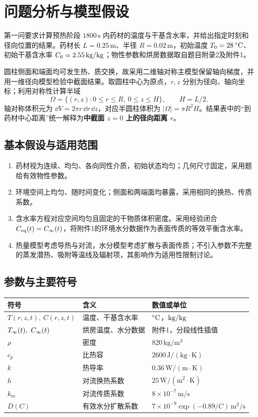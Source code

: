 \section{问题分析与模型假设}

第一问要求计算预热阶段 $1800\,\mathrm{s}$ 内药材的温度与干基含水率，并给出指定时刻和径向位置的结果。药材长 $L=0.25\,\mathrm{m}$、半径 $R=0.02\,\mathrm{m}$，初始温度 $T_0=28\,\celsius$、初始干基含水率 $C_0=2.55\,\kgkg$；物性参数和烘房数据取自题目附录2及附件1\cite{problem}。

圆柱侧面和端面均可发生热、质交换，故采用二维轴对称主模型保留轴向梯度，并用一维径向模型检验中截面结果。取圆柱中心为原点，$r,z$ 分别为径向、轴向坐标；利用对称性计算半域
\begin{equation}
  \Omega=\{(r,z):0\le r\le R,\ 0\le z\le H\},\qquad H=L/2.
  \label{eq:domain}
\end{equation}
轴对称体积元为 $\dd V=2\pi r\,\dd r\,\dd z$，对应半圆柱体积为 $|\Omega|=\pi R^2H$。结果表中的“到药材中心距离”统一解释为\textbf{中截面 $z=0$ 上的径向距离 $r$}。

\subsection{基本假设与适用范围}
\begin{enumerate}
  \item 药材视为连续、均匀、各向同性介质，初始状态均匀；几何尺寸固定，采用题给有效物性参数。
  \item 环境空间上均匀、随时间变化；侧面和两端面均暴露，采用相同的换热、传质系数。
  \item 含水率方程对应空间均匀且固定的干物质体积密度。采用经验闭合 $\Ceq(t)=C_\infty(t)$，将附件1的环境水分数据作为表面传质的等效平衡含水率。
  \item 热量模型考虑导热与对流，水分模型考虑扩散与表面传质；不引入参数不完整的蒸发潜热、吸附等温线及辐射项，其影响作为适用性限制讨论。
\end{enumerate}

\subsection{参数与主要符号}
\begin{center}
\small
\begin{tabular}{lll}
\toprule
符号 & 含义 & 数值或单位\\
\midrule
$T(r,z,t),\ C(r,z,t)$ & 温度、干基含水率 & $\celsius$，$\kgkg$\\
$\Tin(t),\ C_\infty(t)$ & 烘房温度、水分数据 & 附件1，分段线性插值\\
$\rho$ & 密度 & $820\,\mathrm{kg/m^3}$\\
$c_p$ & 比热容 & $2600\,\mathrm{J/(kg\cdot K)}$\\
$k$ & 热导率 & $0.36\,\mathrm{W/(m\cdot K)}$\\
$h$ & 对流换热系数 & $25\,\mathrm{W/(m^2\cdot K)}$\\
$k_m$ & 对流传质系数 & $8\times10^{-7}\,\mathrm{m/s}$\\
$D(C)$ & 有效水分扩散系数 & $7\times10^{-9}\exp(-0.89/C)\,\mathrm{m^2/s}$\\
\bottomrule
\end{tabular}
\end{center}

